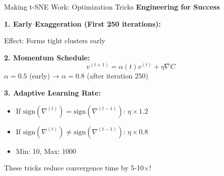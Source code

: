 \documentclass[10pt]{beamer}
\newcommand{\emphtext}[1]{\textcolor{upcblue}{\textbf{#1}}}
\newcommand{\conceptbox}[1]{\colorbox{upcblue!10}{\begin{minipage}{0.85\textwidth}\centering #1\end{minipage}}}
\begin{document}
\begin{frame}{Making t-SNE Work: Optimization Tricks}
\emphtext{Engineering for Success}

\vspace{0.3cm}
\textbf{1. Early Exaggeration (First 250 iterations):}
\begin{center}
\end{center}
\footnotesize Effect: Forms tight clusters early

\vspace{0.2cm}
\textbf{2. Momentum Schedule:}
$$v^{(t+1)} = \alpha(t) v^{(t)} + \eta \nabla C$$
\footnotesize
$\alpha = 0.5$ (early) → $\alpha = 0.8$ (after iteration 250)

\vspace{0.2cm}
\textbf{3. Adaptive Learning Rate:}
\footnotesize
\begin{itemize}
\item If $\text{sign}(\nabla^{(t)}) = \text{sign}(\nabla^{(t-1)})$: $\eta \times 1.2$
\item If $\text{sign}(\nabla^{(t)}) \neq \text{sign}(\nabla^{(t-1)})$: $\eta \times 0.8$
\item Min: 10, Max: 1000
\end{itemize}

\begin{center}
\conceptbox{\footnotesize These tricks reduce convergence time by 5-10×!}
\end{center}
\end{frame}
\end{document}

